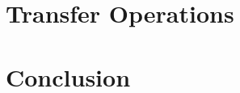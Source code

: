 \documentclass[letterpaper]{article}
\begin{document}
\section{Transfer Operations}

\section{Conclusion}

\pagebreak


\end{document}
